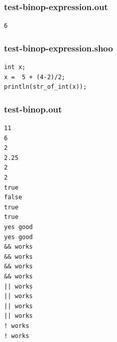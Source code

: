 \documentclass[12pt]{article}
\begin{document}
\subsubsection{test-binop-expression.out}
\begin{mdframed}[hidealllines=true,backgroundcolor=green!10]
\begin{lstlisting}
6\end{lstlisting}
\end{mdframed}
\subsubsection{test-binop-expression.shoo}
\begin{mdframed}[hidealllines=true,backgroundcolor=blue!10]
\begin{lstlisting}
int x;
x =  5 + (4-2)/2;
println(str_of_int(x));\end{lstlisting}
\end{mdframed}
\subsubsection{test-binop.out}
\begin{mdframed}[hidealllines=true,backgroundcolor=green!10]
\begin{lstlisting}
11
6
2
2.25
2
2
true
false
true 
true
yes good
yes good
&& works
&& works
&& works
&& works
|| works
|| works
|| works
|| works
! works
! works
\end{lstlisting}
\end{mdframed}
\end{document}
